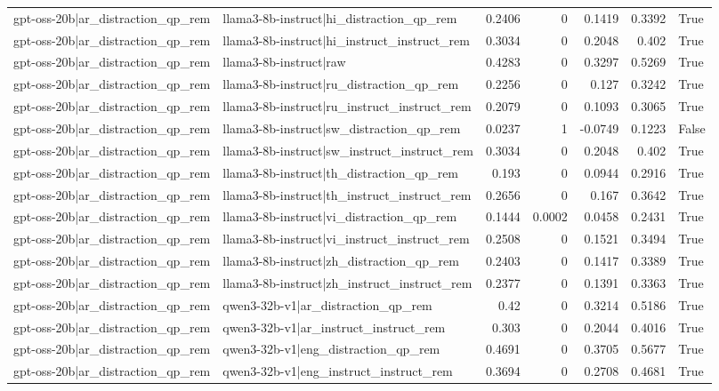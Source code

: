 \begin{table}
\begin{tabular}{l l r r r r l}
gpt-oss-20b|ar_distraction_qp_rem & llama3-8b-instruct|hi_distraction_qp_rem & 0.2406 & 0 & 0.1419 & 0.3392 & True \\
gpt-oss-20b|ar_distraction_qp_rem & llama3-8b-instruct|hi_instruct_instruct_rem & 0.3034 & 0 & 0.2048 & 0.402 & True \\
gpt-oss-20b|ar_distraction_qp_rem & llama3-8b-instruct|raw & 0.4283 & 0 & 0.3297 & 0.5269 & True \\
gpt-oss-20b|ar_distraction_qp_rem & llama3-8b-instruct|ru_distraction_qp_rem & 0.2256 & 0 & 0.127 & 0.3242 & True \\
gpt-oss-20b|ar_distraction_qp_rem & llama3-8b-instruct|ru_instruct_instruct_rem & 0.2079 & 0 & 0.1093 & 0.3065 & True \\
gpt-oss-20b|ar_distraction_qp_rem & llama3-8b-instruct|sw_distraction_qp_rem & 0.0237 & 1 & -0.0749 & 0.1223 & False \\
gpt-oss-20b|ar_distraction_qp_rem & llama3-8b-instruct|sw_instruct_instruct_rem & 0.3034 & 0 & 0.2048 & 0.402 & True \\
gpt-oss-20b|ar_distraction_qp_rem & llama3-8b-instruct|th_distraction_qp_rem & 0.193 & 0 & 0.0944 & 0.2916 & True \\
gpt-oss-20b|ar_distraction_qp_rem & llama3-8b-instruct|th_instruct_instruct_rem & 0.2656 & 0 & 0.167 & 0.3642 & True \\
gpt-oss-20b|ar_distraction_qp_rem & llama3-8b-instruct|vi_distraction_qp_rem & 0.1444 & 0.0002 & 0.0458 & 0.2431 & True \\
gpt-oss-20b|ar_distraction_qp_rem & llama3-8b-instruct|vi_instruct_instruct_rem & 0.2508 & 0 & 0.1521 & 0.3494 & True \\
gpt-oss-20b|ar_distraction_qp_rem & llama3-8b-instruct|zh_distraction_qp_rem & 0.2403 & 0 & 0.1417 & 0.3389 & True \\
gpt-oss-20b|ar_distraction_qp_rem & llama3-8b-instruct|zh_instruct_instruct_rem & 0.2377 & 0 & 0.1391 & 0.3363 & True \\
gpt-oss-20b|ar_distraction_qp_rem & qwen3-32b-v1|ar_distraction_qp_rem & 0.42 & 0 & 0.3214 & 0.5186 & True \\
gpt-oss-20b|ar_distraction_qp_rem & qwen3-32b-v1|ar_instruct_instruct_rem & 0.303 & 0 & 0.2044 & 0.4016 & True \\
gpt-oss-20b|ar_distraction_qp_rem & qwen3-32b-v1|eng_distraction_qp_rem & 0.4691 & 0 & 0.3705 & 0.5677 & True \\
gpt-oss-20b|ar_distraction_qp_rem & qwen3-32b-v1|eng_instruct_instruct_rem & 0.3694 & 0 & 0.2708 & 0.4681 & True \\

\end{tabular}
\end{table}
